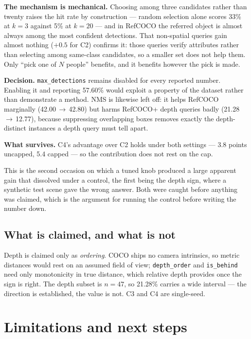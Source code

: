 \documentclass[11pt,a4paper]{article}
\begin{document}
\textbf{The mechanism is mechanical.} Choosing among three candidates rather than
twenty raises the hit rate by construction --- random selection alone scores 33\% at
$k{=}3$ against 5\% at $k{=}20$ --- and in RefCOCO the referred object is almost
always among the most confident detections. That non-spatial queries gain almost
nothing ($+0.5$ for C2) confirms it: those queries verify attributes rather than
selecting among same-class candidates, so a smaller set does not help them. Only
``pick one of $N$ people'' benefits, and it benefits however the pick is made.

\textbf{Decision.} \texttt{max\_detections} remains disabled for every reported
number. Enabling it and reporting 57.60\% would exploit a property of the dataset
rather than demonstrate a method. NMS is likewise left off: it helps RefCOCO
marginally (42.00\,$\to$\,42.80) but harms RefCOCO+ depth queries badly
(21.28\,$\to$\,12.77), because suppressing overlapping boxes removes exactly the
depth-distinct instances a depth query must tell apart.

\textbf{What survives.} C4's advantage over C2 holds under both settings --- 3.8
points uncapped, 5.4 capped --- so the contribution does not rest on the cap.

This is the second occasion on which a tuned knob produced a large apparent gain that
dissolved under a control, the first being the depth sign, where a synthetic test
scene gave the wrong answer. Both were caught before anything was claimed, which is
the argument for running the control before writing the number down.

\subsection{What is claimed, and what is not}

Depth is claimed only as \emph{ordering}. COCO ships no camera intrinsics, so metric
distances would rest on an assumed field of view; \texttt{depth\_order} and
\texttt{is\_behind} need only monotonicity in true distance, which relative depth
provides once the sign is right. The depth subset is $n{=}47$, so 21.28\% carries a
wide interval --- the direction is established, the value is not. C3 and C4 are
single-seed.

\section{Limitations and next steps}
\end{document}
